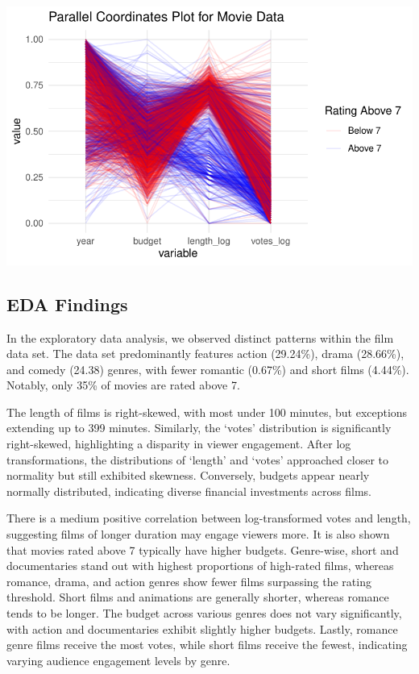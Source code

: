\documentclass[
  11pt,
]{article}
\begin{document}
\includegraphics{Group_07_Analysis_files/figure-pdf/unnamed-chunk-19-1.pdf}

\hypertarget{eda-findings}{%
\subsection{EDA Findings}\label{eda-findings}}

In the exploratory data analysis, we observed distinct patterns within
the film data set. The data set predominantly features action (29.24\%),
drama (28.66\%), and comedy (24.38) genres, with fewer romantic (0.67\%)
and short films (4.44\%). Notably, only 35\% of movies are rated above
7.

The length of films is right-skewed, with most under 100 minutes, but
exceptions extending up to 399 minutes. Similarly, the `votes'
distribution is significantly right-skewed, highlighting a disparity in
viewer engagement. After log transformations, the distributions of
`length' and `votes' approached closer to normality but still exhibited
skewness. Conversely, budgets appear nearly normally distributed,
indicating diverse financial investments across films.

There is a medium positive correlation between log-transformed votes and
length, suggesting films of longer duration may engage viewers more. It
is also shown that movies rated above 7 typically have higher budgets.
Genre-wise, short and documentaries stand out with highest proportions
of high-rated films, whereas romance, drama, and action genres show
fewer films surpassing the rating threshold. Short films and animations
are generally shorter, whereas romance tends to be longer. The budget
across various genres does not vary significantly, with action and
documentaries exhibit slightly higher budgets. Lastly, romance genre
films receive the most votes, while short films receive the fewest,
indicating varying audience engagement levels by genre.
\end{document}
